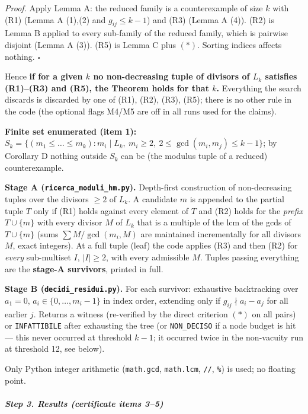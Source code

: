 \documentclass[11pt,a4paper]{article}
\begin{document}
\emph{Proof.} Apply Lemma A: the reduced family is a counterexample of
size \(k\) with (R1) (Lemma A (1),(2) and \(g_{ij}\le k-1\)) and (R3)
(Lemma A (4)). (R2) is Lemma B applied to every sub-family of the
reduced family, which is pairwise disjoint (Lemma A (3)). (R5) is Lemma
C plus \((*)\). Sorting indices affects nothing. \(\square\)

Hence \textbf{if for a given \(k\) no non-decreasing tuple of divisors
of \(L_k\) satisfies (R1)--(R3) and (R5), the Theorem holds for that
\(k\).} Everything the search discards is discarded by one of (R1),
(R2), (R3), (R5); there is no other rule in the code (the optional flags
M4/M5 are off in all runs used for the claims).

\textbf{Finite set enumerated (item 1):}
\(S_k=\{(m_1\le\dots\le m_k): m_i\mid L_k,\ m_i\ge2,\ 2\le\gcd(m_i,m_j)\le k-1\}\);
by Corollary D nothing outside \(S_k\) can be (the modulus tuple of a
reduced) counterexample.

\textbf{Stage A (\texttt{ricerca\_moduli\_hm.py}).} Depth-first
construction of non-decreasing tuples over the divisors \(\ge2\) of
\(L_k\). A candidate \(m\) is appended to the partial tuple \(T\) only
if (R1) holds against every element of \(T\) and (R2) holds for the
\emph{prefix} \(T\cup\{m\}\) with every divisor \(M\) of \(L_k\) that is
a multiple of the lcm of the gcds of \(T\cup\{m\}\) (sums
\(\sum M/\gcd(m_i,M)\) are maintained incrementally for all divisors
\(M\), exact integers). At a full tuple (leaf) the code applies (R3) and
then (R2) for \emph{every} sub-multiset \(I\), \(|I|\ge2\), with every
admissible \(M\). Tuples passing everything are the \textbf{stage-A
survivors}, printed in full.

\textbf{Stage B (\texttt{decidi\_residui.py}).} For each survivor:
exhaustive backtracking over \(a_1=0\), \(a_i\in\{0,\dots,m_i-1\}\) in
index order, extending only if \(g_{ij}\nmid a_i-a_j\) for all earlier
\(j\). Returns a witness (re-verified by the direct criterion \((*)\) on
all pairs) or \texttt{INFATTIBILE} after exhausting the tree (or
\texttt{NON\_DECISO} if a node budget is hit --- this never occurred at
threshold \(k-1\); it occurred twice in the non-vacuity run at threshold
12, see below).

Only Python integer arithmetic (\texttt{math.gcd}, \texttt{math.lcm},
\texttt{//}, \texttt{\%}) is used; no floating point.

\subparagraph{Step 3. Results (certificate items
3--5)}\label{step-3.-results-certificate-items-35}
\end{document}
